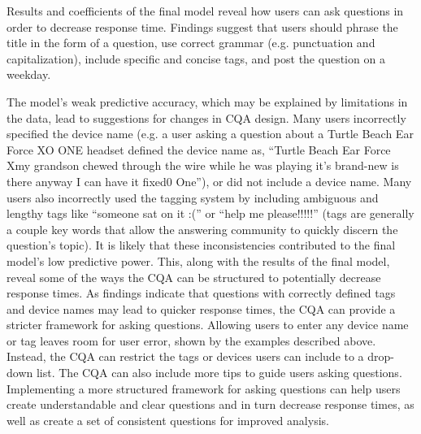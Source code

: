 \documentclass[]{interact}\usepackage[]{graphicx}\usepackage[]{color}
\begin{document}
Results and coefficients of the final model reveal how users can ask questions in order to decrease response time. Findings suggest that users should phrase the title in the form of a question, use correct grammar (e.g. punctuation and capitalization), include specific and concise tags, and post the question on a weekday. 


The model's weak predictive accuracy, which may be explained by limitations in the data, lead to suggestions for changes in CQA design. Many users incorrectly specified the device name (e.g. a user asking a question about a Turtle Beach Ear Force XO ONE headset defined the device name as, ``Turtle Beach Ear Force Xmy grandson chewed through the wire while he was playing it's brand-new is there anyway I can have it fixed0 One''), or did not include a device name. Many users also incorrectly used the tagging system by including ambiguous and lengthy tags like ``someone sat on it :('' or ``help me please!!!!!'' (tags are generally a couple key words that allow the answering community to quickly discern the question's topic). It is likely that these inconsistencies contributed to the final model's low predictive power. This, along with the results of the final model, reveal some of the ways the CQA can be structured to potentially decrease response times. As findings indicate that questions with correctly defined tags and device names may lead to quicker response times, the CQA can provide a stricter framework for asking questions. Allowing users to enter any device name or tag leaves room for user error, shown by the examples described above. Instead, the CQA can restrict the tags or devices users can include to a drop-down list. The CQA can also include more tips to guide users asking questions. Implementing a more structured framework for asking questions can help users create understandable and clear questions and in turn decrease response times, as well as create a set of consistent questions for improved analysis. 

% 
\end{document}
